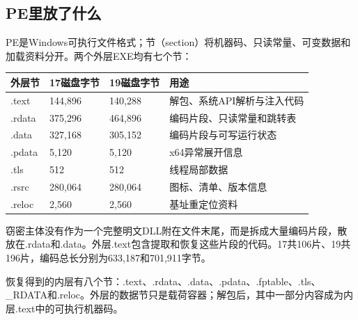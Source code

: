 \documentclass[UTF8,a4paper,zihao=5,fontset=windows]{ctexart}
\newcommand{\code}[1]{{\ttfamily\small #1}}
\begin{document}
\subsection{PE里放了什么}
PE是Windows可执行文件格式；节（section）将机器码、只读常量、可变数据和加载资料分开。两个外层EXE均有七个节：
\begingroup\small
\begin{longtable}{@{}L{24mm} L{31mm} L{31mm} L{64mm}@{}}
\toprule 外层节 & 17磁盘字节 & 19磁盘字节 & 用途 \\
\midrule\endhead
\code{.\allowbreak{}text} & 144,896 & 140,288 & 解包、系统API解析与注入代码 \\
\code{.\allowbreak{}rdata} & 375,296 & 464,896 & 编码片段、只读常量和跳转表 \\
\code{.\allowbreak{}data} & 327,168 & 305,152 & 编码片段与可写运行状态 \\
\code{.\allowbreak{}pdata} & 5,120 & 5,120 & x64异常展开信息 \\
\code{.\allowbreak{}tls} & 512 & 512 & 线程局部数据 \\
\code{.\allowbreak{}rsrc} & 280,064 & 280,064 & 图标、清单、版本信息 \\
\code{.\allowbreak{}reloc} & 2,560 & 2,560 & 基址重定位资料 \\
\bottomrule\end{longtable}\endgroup


窃密主体没有作为一个完整明文DLL附在文件末尾，而是拆成大量编码片段，散放在\code{.rdata}和\code{.data}。外层\code{.text}包含提取和恢复这些片段的代码。17共106片、19共196片，编码总长分别为633,187和701,911字节。

恢复得到的内层有八个节：\code{.text}、\code{.rdata}、\code{.data}、\code{.pdata}、\code{.fptable}、\code{.tls}、\code{\_RDATA}和\code{.reloc}。外层的数据节只是载荷容器；解包后，其中一部分内容成为内层\code{.text}中的可执行机器码。
\end{document}
